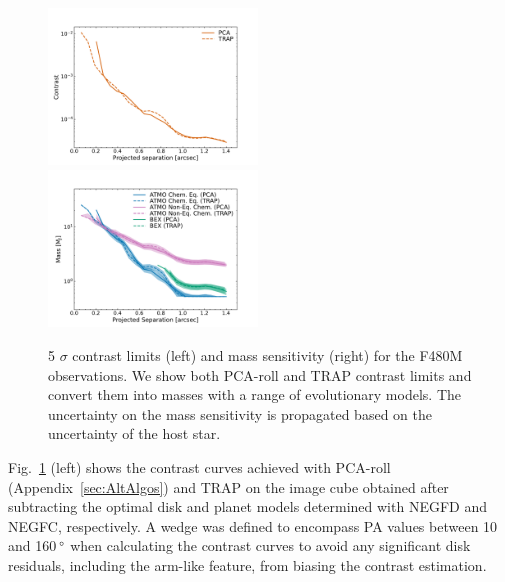\documentclass[longauth]{aa}
\begin{document}
\begin{appendix}
    \begin{figure}
    \centering
    \includegraphics[width=0.495\textwidth]{FigDa.pdf}
    \includegraphics[width=0.495\textwidth]{FigDb.pdf}
    \caption{5 $\sigma$ contrast limits (left) and mass sensitivity (right) for the F480M observations. We show both PCA-roll and TRAP \citep{Samland2021} contrast limits and convert them into masses with a range of evolutionary models. The uncertainty on the mass sensitivity is propagated based on the uncertainty of the host star.}
    \label{fig:contrast_mass_limits}
    \end{figure}

Fig.~\ref{fig:contrast_mass_limits} (left) shows the contrast curves achieved with PCA-roll (Appendix~\ref{sec:AltAlgos}) and TRAP \citep{Samland2021} on the image cube obtained after subtracting the optimal disk and planet models determined with NEGFD and NEGFC, respectively. A wedge was defined to encompass PA values between 10 and 160\,$^\circ$ when calculating the contrast curves to avoid any significant disk residuals, including the arm-like feature, 
from biasing the contrast estimation.


\end{appendix}
\end{document}
